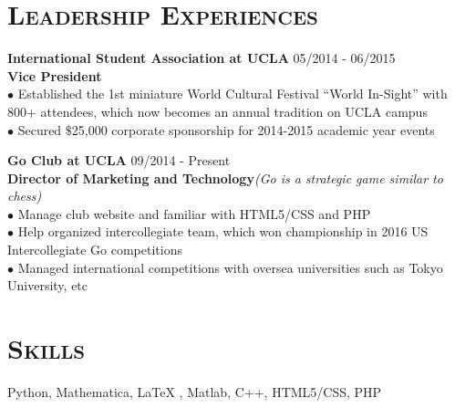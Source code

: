 \documentclass[line, margin]{res}
\begin{document}
\begin{resume}
\section{\textsc{Leadership Experiences}}
\textbf{International Student Association at UCLA } \hfill 05/2014 - 06/2015\\
\textbf{Vice President}\\
$\bullet$  Established the 1st miniature World Cultural Festival \enquote{World In-Sight} with 800+ attendees, which now becomes an annual tradition on UCLA campus\\
$\bullet$  Secured $\$$25,000 corporate sponsorship for 2014-2015 academic year events

\textbf{Go Club at UCLA }\hfill 09/2014 - Present\\
\textbf{Director of Marketing and Technology}\textsl{(Go is a strategic game similar to chess)} \\
$\bullet$  Manage club website and familiar with HTML5/CSS and PHP\\
$\bullet$  Help organized intercollegiate team, which won championship in 2016 US Intercollegiate Go competitions \\
$\bullet$  Managed international competitions with oversea universities such as Tokyo University, etc

\section{\textsc{Skills}}
Python, Mathematica, \LaTeX{} , Matlab, C++, HTML5/CSS, PHP
\end{resume}
\end{document}
